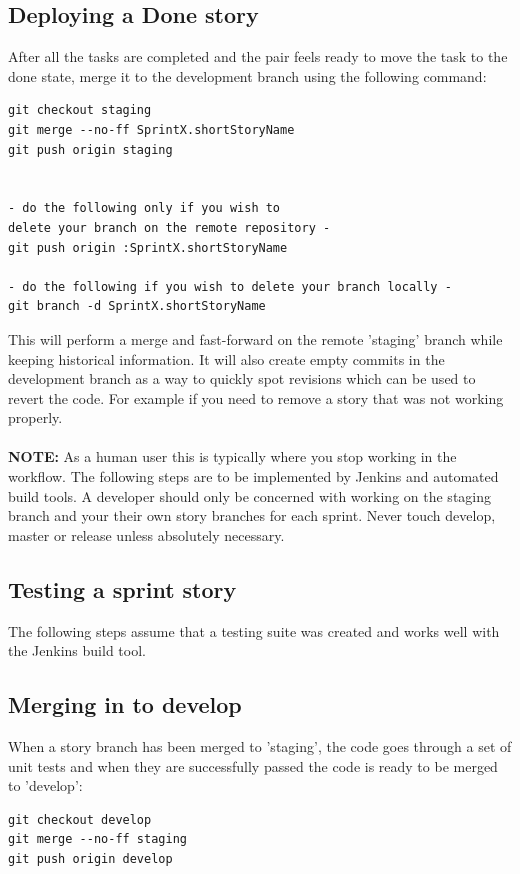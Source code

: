 \subsection{Deploying a Done story}

After all the tasks are completed and the pair feels ready to move the task to the done state, merge it to the development branch using the following command:\\

\begin{verbatim}
git checkout staging
git merge --no-ff SprintX.shortStoryName
git push origin staging


- do the following only if you wish to 
delete your branch on the remote repository -
git push origin :SprintX.shortStoryName

- do the following if you wish to delete your branch locally -  
git branch -d SprintX.shortStoryName
\end{verbatim}
This will perform a merge and fast-forward on the remote 'staging' branch while keeping historical information.
It will also create empty commits in the development branch as a way to quickly spot revisions which can be used to revert the code. For example if you need to remove a story that was not working properly.\\\\
\textbf {NOTE:}
As a human user this is typically where you stop working in the workflow. The following steps are to be implemented by Jenkins and automated build tools. A developer should only be concerned with working on the staging branch and your their own story branches for each sprint. Never touch develop, master or release unless absolutely necessary.

\subsection{Testing a sprint story}

The following steps assume that a testing suite was created and works well with the Jenkins build tool. 

\subsection{Merging in to develop}
When a story branch has been merged to 'staging', the code goes through a set of unit tests and when they are  successfully passed the code is ready to be merged to 'develop': 
\begin{verbatim}
git checkout develop
git merge --no-ff staging
git push origin develop
\end{verbatim}


